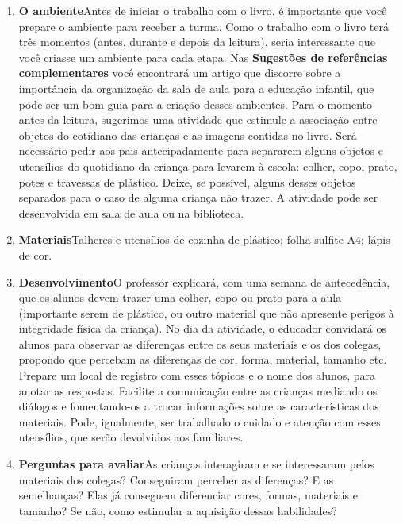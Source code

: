 \documentclass[11pt]{extarticle}
\begin{document}
\begin{enumerate}
\item \textbf{O ambiente}\quad Antes de iniciar o trabalho com o livro, é importante que você 
prepare o ambiente para receber a turma. Como o trabalho com o livro terá 
três momentos (antes, durante e depois da leitura), seria interessante que você 
criasse um ambiente para cada etapa. Nas \textbf{Sugestões de referências complementares} 
você encontrará um artigo que discorre sobre a importância da organização da sala 
de aula para a educação infantil, que pode ser um bom guia para a criação desses 
ambientes.
Para o momento antes da leitura, sugerimos uma atividade que estimule a
associação entre  objetos do cotidiano das crianças e as imagens contidas no livro. Será necessário pedir aos pais antecipadamente para separarem alguns objetos e utensílios do quotidiano da criança para levarem à escola: colher, copo, prato, potes e travessas de plástico. Deixe, se possível, alguns desses objetos separados para o caso de alguma criança não trazer. A atividade pode ser desenvolvida em sala de aula ou na biblioteca.



\item \textbf{Materiais}\quad Talheres e utensílios de cozinha de plástico; folha sulfite A4; lápis de cor.

\item \textbf{Desenvolvimento}\quad O professor explicará, com uma semana de antecedência, que os alunos devem trazer uma colher, copo ou prato para a aula (importante serem de plástico, ou outro material que não apresente perigos à integridade física da criança). No dia da atividade, o educador convidará os alunos para observar as diferenças entre os seus materiais e os dos colegas, propondo que percebam as diferenças de cor, forma, material,  tamanho etc. Prepare um local de registro com esses tópicos e o nome dos alunos, para anotar as respostas. Facilite a comunicação entre as crianças mediando os diálogos e fomentando-os a trocar informações sobre as características dos materiais. Pode, igualmente, ser trabalhado o cuidado e atenção com esses utensílios, que serão devolvidos aos familiares.

\item \textbf{Perguntas para avaliar}\quad As crianças interagiram e se interessaram pelos materiais dos colegas? Conseguiram perceber as diferenças? E as semelhanças? Elas já conseguem diferenciar cores, formas, materiais e tamanho? Se não, como estimular a aquisição dessas habilidades? 

\end{enumerate}
\end{document}
